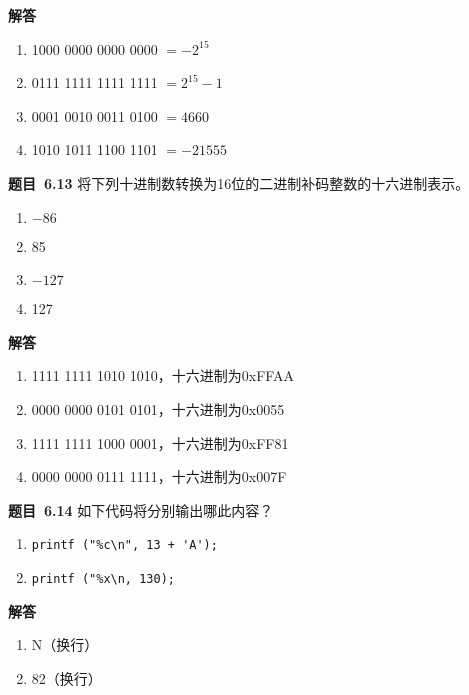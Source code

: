 \documentclass[10pt,a4paper,UTF8]{ctexart}
\newcommand{\problemname}{待定义}
\newenvironment{problem}{\begin{shaded}\par\noindent\textbf{题目\  \problemname}}{\end{shaded}\par}
\newenvironment{solution}{\par\noindent\textbf{解答}\ }{\par}
\begin{document}
\begin{solution}
	\begin{enumerate}[(1)]
		\item 1000 0000 0000 0000 $=-2^{15}$
		\item 0111 1111 1111 1111 $=2^{15}-1$
		\item 0001 0010 0011 0100 $=4660$
		\item 1010 1011 1100 1101 $=-21555$
	\end{enumerate}
\end{solution}


\renewcommand{\problemname}{6.13}
\begin{problem}
	将下列十进制数转换为16位的二进制补码整数的十六进制表示。
	\begin{enumerate}[(1)]
		\item $-86$
		\item 85
		\item $-127$
		\item 127
	\end{enumerate}
\end{problem}

\begin{solution}
	\begin{enumerate}[(1)]
		\item 1111 1111 1010 1010，十六进制为0xFFAA
		\item 0000 0000 0101 0101，十六进制为0x0055
		\item 1111 1111 1000 0001，十六进制为0xFF81
		\item 0000 0000 0111 1111，十六进制为0x007F
	\end{enumerate}
	
\end{solution}


\renewcommand{\problemname}{6.14}
\begin{problem}
	如下代码将分别输出哪此内容？
	\begin{enumerate}[(1)]
		\item \verb|printf ("%c\n", 13 + 'A');|
		\item \verb|printf ("%x\n, 130);|
	\end{enumerate}
\end{problem}

\begin{solution}
	\begin{enumerate}[(1)]
		\item N（换行）
		\item 82（换行）
	\end{enumerate}
\end{solution}
\end{document}
